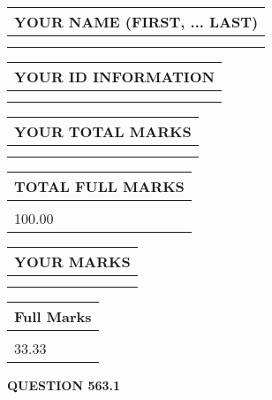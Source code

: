 \documentclass{ctexart}
\begin{document}
   
   
   
\newpage 
\setcounter{page}{ 
   563001 } 
   
   
   
   
\noindent\begin{tabular}{|l|}
\hline
YOUR NAME (FIRST, ... LAST)  \\
\hline
 \\ 
 \\ 
\hline
\end{tabular}
\hspace{0.05in} \begin{tabular}{|l|}
\hline
 YOUR   ID   INFORMATION  \\
\hline
 \\ 
 \\ 
\hline
\end{tabular}
   
   
\vspace{0.2in}\noindent\begin{tabular}{|l|}
\hline
YOUR TOTAL MARKS  \\
\hline
 \\ 
 \\ 
\hline
\end{tabular}
\hspace{0.05in} \begin{tabular}{|l|}
\hline
TOTAL FULL MARKS  \\
\hline
 \\ 
100.00 \\
\hline
\end{tabular}
   
   
 \vspace{0.2in}
 
 
 
 
   
   
  
\vspace{0.2in}
  
\noindent\begin{tabular}{|l|}
\hline
 YOUR MARKS  \\
\hline
 \\ 
 \\ 
\hline
\end{tabular}
\hspace{0.05in} \begin{tabular}{|l|}
\hline
 Full Marks  \\
\hline
 \\ 
33.33 \\
\hline
\end{tabular}
{\textbf{\Large{QUESTION
563.1 
}}}
  
\end{document}
